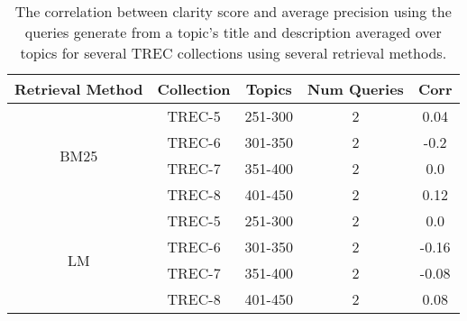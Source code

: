 %
%
%
%
%
%
\begin{table*}[hbt!]
  \centering
  \begin{tabular}{| c || c | c | c || c|}%
    \hline
    Retrieval Method & Collection & Topics & Num Queries & Corr\\%
    \hline
    \multirow{4}{*}{BM25}
    &   TREC-5 & 251-300 & 2 & 0.04\\%
    \cline{2-5}
    &   TREC-6 & 301-350 & 2 & -0.2\\%
    \cline{2-5}
    &   TREC-7 & 351-400 & 2 & 0.0\\%
    \cline{2-5}
    &   TREC-8 & 401-450 & 2 & 0.12\\%
    \hline%
    \multirow{4}{*}{LM}
    &   TREC-5 & 251-300 & 2 & 0.0\\%
    \cline{2-5}
    &   TREC-6 & 301-350 & 2 & -0.16\\%
    \cline{2-5}
    &   TREC-7 & 351-400 & 2 & -0.08\\%
    \cline{2-5}
    &   TREC-8 & 401-450 & 2 & 0.08\\%
    \hline
  \end{tabular}
  \caption{The correlation between clarity score and average precision using the queries generate from a topic's title and description averaged over topics for several TREC collections using several retrieval methods.}
  \label{table:bytopic}
\end{table*}